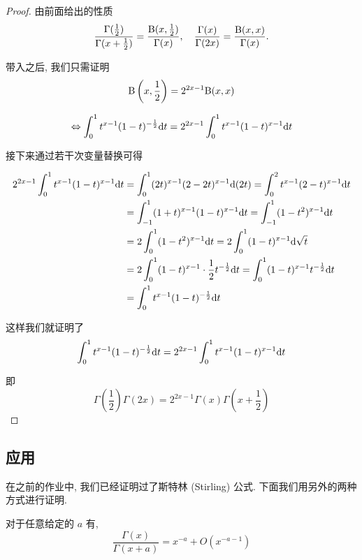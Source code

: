 \begin{proof}
	由前面给出的性质
	$$\dfrac{\Gamma(\frac{1}{2})}{\Gamma (x+\frac{1}{2})}=\dfrac{\text {B}(x,\frac 1 2)}{\Gamma(x)},\quad \dfrac{\Gamma(x)}{\Gamma(2x)}=\dfrac{\text {B}(x,x)}{\Gamma(x)}.$$

	带入之后, 我们只需证明
	$$\text {B}\left(x,\frac{1}{2}\right)=2^{2x-1}\text {B}(x,x)$$

	$$\Leftrightarrow \int_0^1 t^{x-1}(1-t)^{-\frac 1 2}\text {d} t=2^{2x-1}\int_0^1 t^{x-1}(1-t)^{x-1}\text {d} t$$

	接下来通过若干次变量替换可得

	\begin{equation*}
		\begin{aligned}
			2^{2x-1}\int_0^1 t^{x-1}(1-t)^{x-1}\text {d} t &= \int_0^1(2t)^{x-1}(2-2t)^{x-1}\text {d} (2t)
			= \int_0^2 t^{x-1}(2-t)^{x-1} \text {d} t \\
			&= \int_{-1}^1 (1+t)^{x-1}(1-t)^{x-1} \text {d} t
			= \int_{-1}^1 (1-t^2)^{x-1} \text {d} t \\
			&= 2\int_0^1 (1-t^2)^{x-1} \text {d} t
			= 2 \int _0^1 (1-t)^{x-1} \text {d} \sqrt{t} \\
			&= 2 \int _0^1 (1-t)^{x-1}\cdot \frac 1 2 t^{-\frac 1 2} \text {d} t
			= \int_0^1 (1-t)^{x-1}t^{-\frac 1 2} \text {d} t \\
			&= \int_0^1 t^{x-1}(1-t)^{-\frac 1 2} \text {d} t
		\end{aligned}
	\end{equation*}

	这样我们就证明了
	$$ \int_0^1 t^{x-1}(1-t)^{-\frac 1 2}\text {d} t=2^{2x-1}\int_0^1 t^{x-1}(1-t)^{x-1}\text {d} t$$

	即 $$\Gamma\left(\frac 1 2\right)\Gamma(2x)=2^{2x-1}\Gamma(x)\Gamma\left(x+\frac 1 2\right)$$
\end{proof}
\subsection{应用}
在之前的作业中, 我们已经证明过了斯特林 (Stirling) 公式. 下面我们用另外的两种方式进行证明.

\begin{lemma}
	对于任意给定的 $a$ 有,
	$$\dfrac{\Gamma(x)}{\Gamma(x+a)}=x^{-a}+O\left(x^{-a-1}\right)$$
\end{lemma}

